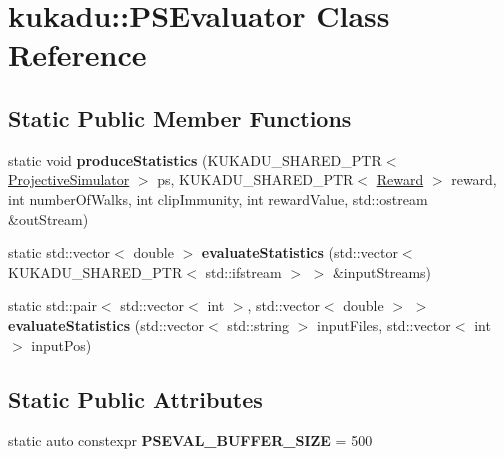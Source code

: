 \hypertarget{classkukadu_1_1PSEvaluator}{}\section{kukadu\+:\+:P\+S\+Evaluator Class Reference}
\label{classkukadu_1_1PSEvaluator}
\subsection*{Static Public Member Functions}
\begin{DoxyCompactItemize}
\item 
static void {\bfseries produce\+Statistics} (K\+U\+K\+A\+D\+U\+\_\+\+S\+H\+A\+R\+E\+D\+\_\+\+P\+TR$<$ \hyperlink{classkukadu_1_1ProjectiveSimulator}{Projective\+Simulator} $>$ ps, K\+U\+K\+A\+D\+U\+\_\+\+S\+H\+A\+R\+E\+D\+\_\+\+P\+TR$<$ \hyperlink{classkukadu_1_1Reward}{Reward} $>$ reward, int number\+Of\+Walks, int clip\+Immunity, int reward\+Value, std\+::ostream \&out\+Stream)\hypertarget{classkukadu_1_1PSEvaluator_ac61d51fa489996d05fef58be55d57e7e}{}\label{classkukadu_1_1PSEvaluator_ac61d51fa489996d05fef58be55d57e7e}

\item 
static std\+::vector$<$ double $>$ {\bfseries evaluate\+Statistics} (std\+::vector$<$ K\+U\+K\+A\+D\+U\+\_\+\+S\+H\+A\+R\+E\+D\+\_\+\+P\+TR$<$ std\+::ifstream $>$ $>$ \&input\+Streams)\hypertarget{classkukadu_1_1PSEvaluator_a4da4ad6cc48d918d8fabce26a560fcb1}{}\label{classkukadu_1_1PSEvaluator_a4da4ad6cc48d918d8fabce26a560fcb1}

\item 
static std\+::pair$<$ std\+::vector$<$ int $>$, std\+::vector$<$ double $>$ $>$ {\bfseries evaluate\+Statistics} (std\+::vector$<$ std\+::string $>$ input\+Files, std\+::vector$<$ int $>$ input\+Pos)\hypertarget{classkukadu_1_1PSEvaluator_aff218534a5ddb7d3c7b9c7452ba27015}{}\label{classkukadu_1_1PSEvaluator_aff218534a5ddb7d3c7b9c7452ba27015}

\end{DoxyCompactItemize}
\subsection*{Static Public Attributes}
\begin{DoxyCompactItemize}
\item 
static auto constexpr {\bfseries P\+S\+E\+V\+A\+L\+\_\+\+B\+U\+F\+F\+E\+R\+\_\+\+S\+I\+ZE} = 500\hypertarget{classkukadu_1_1PSEvaluator_a59da5d274bf294c24a7374c0b7ab58b2}{}\label{classkukadu_1_1PSEvaluator_a59da5d274bf294c24a7374c0b7ab58b2}

\end{DoxyCompactItemize}



